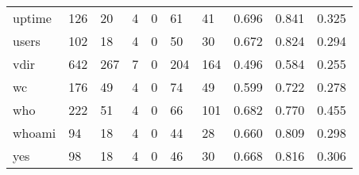 \begin{longtable}{lp{2.0cm}p{2.0cm}p{2.0cm}p{2.0cm}p{2.0cm}p{2.0cm}p{2.0cm}p{2.0cm}p{2.0cm}}
uptime    &                    126 &                                 20 &                                 4 &                                0 &                                61 &                              41 &                                0.696 &                                  0.841 &                                0.325 \\
users     &                    102 &                                 18 &                                 4 &                                0 &                                50 &                              30 &                                0.672 &                                  0.824 &                                0.294 \\
vdir      &                    642 &                                267 &                                 7 &                                0 &                               204 &                             164 &                                0.496 &                                  0.584 &                                0.255 \\
wc        &                    176 &                                 49 &                                 4 &                                0 &                                74 &                              49 &                                0.599 &                                  0.722 &                                0.278 \\
who       &                    222 &                                 51 &                                 4 &                                0 &                                66 &                             101 &                                0.682 &                                  0.770 &                                0.455 \\
whoami    &                     94 &                                 18 &                                 4 &                                0 &                                44 &                              28 &                                0.660 &                                  0.809 &                                0.298 \\
yes       &                     98 &                                 18 &                                 4 &                                0 &                                46 &                              30 &                                0.668 &                                  0.816 &                                0.306 \\
\end{longtable}
